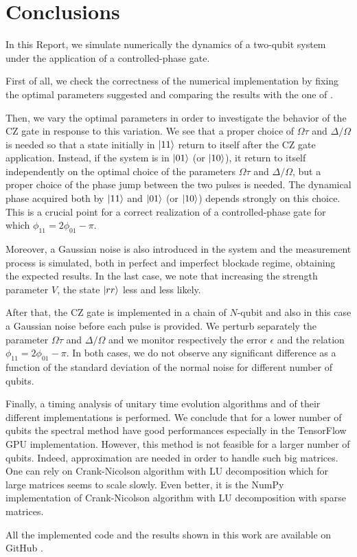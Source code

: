 \documentclass[rmp,10pt,onecolumn,fleqn,notitlepage]{revtex4-1}
\begin{document}
\clearpage

\section{Conclusions}
\label{sec:conclusions}

In this Report, we simulate numerically the dynamics of a two-qubit system under the application of a controlled-phase gate. 

First of all, we check the correctness of the numerical implementation by fixing the optimal parameters suggested and comparing the results with the one of \cite{PhysRevLett.123.170503}. 

Then, we vary the optimal parameters in order to investigate the behavior of the CZ gate in response to this variation. We see that a proper choice of $\Omega\tau$ and $\Delta/\Omega$ is needed so that a state initially in $\left\vert{11}\right\rangle$ return to itself after the CZ gate application. Instead, if the system is in $\left\vert{01}\right\rangle$ (or $\left\vert{10}\right\rangle$), it return to itself independently on the optimal choice of the parameters $\Omega\tau$ and $\Delta/\Omega$, but a proper choice of the phase jump between the two pulses is needed. The dynamical phase acquired both by $\left\vert{11}\right\rangle$ and $\left\vert{01}\right\rangle$ (or $\left\vert{10}\right\rangle$) depends strongly on this choice. This is a crucial point for a correct realization of a controlled-phase gate for which $\phi_{11}=2\phi_{01}-\pi$.

Moreover, a Gaussian noise is also introduced in the system and the measurement process is simulated, both in perfect and imperfect blockade regime, obtaining the expected results. In the last case, we note that increasing the strength parameter $V$, the state $\left\vert{rr}\right\rangle$ less and less likely.

After that, the CZ gate is implemented in a chain of $N$-qubit and also in this case a Gaussian noise before each pulse is provided. We perturb separately the parameter $\Omega\tau$ and $\Delta/\Omega$ and we monitor respectively the error $\epsilon$ and the relation $\phi_{11}=2\phi_{01}-\pi$.
In both cases, we do not observe any significant difference as a function of the standard deviation of the normal noise for different number of qubits.

Finally, a timing analysis of unitary time evolution algorithms and of their different implementations is performed. We conclude that for a lower number of qubits the spectral method have good performances especially in the TensorFlow GPU implementation. However, this method is not feasible for a larger number of qubits. Indeed, approximation are needed in order to handle such big matrices. One can rely on Crank-Nicolson algorithm with LU decomposition which for large matrices seems to scale slowly. Even better, it is the NumPy implementation of Crank-Nicolson algorithm with LU decomposition with sparse matrices.

All the implemented code and the results shown in this work are available on GitHub \cite{github}.


{}
\end{document}

